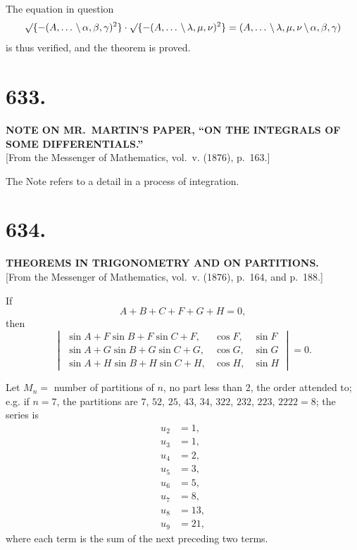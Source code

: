 \documentclass[12pt,a4paper]{article}
\theoremstyle{plain}
\theoremstyle{definition}
\theoremstyle{remark}
\begin{document}
The equation in question
\[
\surd\{-(A, \ldots \,\backslash\, \alpha, \beta, \gamma)^2\} \cdot \surd\{-(A, \ldots \,\backslash\, \lambda, \mu, \nu)^2\} = (A, \ldots \,\backslash\, \lambda, \mu, \nu \,\backslash\, \alpha, \beta, \gamma)
\]
is thus verified, and the theorem is proved.

\clearpage
\setcounter{page}{15}

\section*{633.}

\begin{center}
\textbf{NOTE ON MR.~MARTIN'S PAPER, ``ON THE INTEGRALS OF SOME DIFFERENTIALS.''}\\[1em]
[From the Messenger of Mathematics, vol.~v. (1876), p.~163.]
\end{center}

The Note refers to a detail in a process of integration.

\clearpage
\setcounter{page}{16}

\section*{634.}

\begin{center}
\textbf{THEOREMS IN TRIGONOMETRY AND ON PARTITIONS.}\\[1em]
[From the Messenger of Mathematics, vol.~v. (1876), p.~164, and p.~188.]
\end{center}

If
\[
A + B + C + F + G + H = 0,
\]
then
\[
\begin{vmatrix}
\sin A + F\sin B + F\sin C + F, & \cos F, & \sin F \\
\sin A + G\sin B + G\sin C + G, & \cos G, & \sin G \\
\sin A + H\sin B + H\sin C + H, & \cos H, & \sin H
\end{vmatrix} = 0.
\]

Let $M_n = $ number of partitions of $n$, no part less than $2$, the order attended to; e.g. if $n=7$, the partitions are $7$, $52$, $25$, $43$, $34$, $322$, $232$, $223$, $2222 = 8$; the series is
\begin{align*}
u_2 &= 1, \\
u_3 &= 1, \\
u_4 &= 2, \\
u_5 &= 3, \\
u_6 &= 5, \\
u_7 &= 8, \\
u_8 &= 13, \\
u_9 &= 21,
\end{align*}
where each term is the sum of the next preceding two terms.
\end{document}
